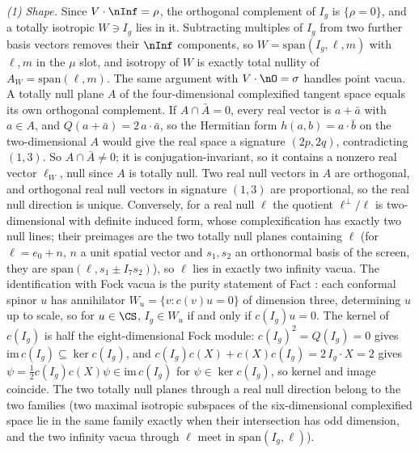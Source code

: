 \emph{(1) Shape.} Since $V\cdot\nInf = \rho$, the orthogonal complement of $I_g$ is $\{\rho = 0\}$, and a totally isotropic $W \ni I_g$ lies in it. Subtracting multiples of $I_g$ from two further basis vectors removes their $\nInf$ components, so $W = \mathrm{span}(I_g, \ell, m)$ with $\ell, m$ in the $\mu$ slot, and isotropy of $W$ is exactly total nullity of $A_W = \mathrm{span}(\ell, m)$. The same argument with $V\cdot\nO = \sigma$ handles point vacua. A totally null plane $A$ of the four-dimensional complexified tangent space equals its own orthogonal complement. If $A \cap \bar A = 0$, every real vector is $a + \bar a$ with $a \in A$, and $Q(a + \bar a) = 2\,a\cdot\bar a$, so the Hermitian form $h(a, b) = a\cdot\bar b$ on the two-dimensional $A$ would give the real space a signature $(2p, 2q)$, contradicting $(1,3)$. So $A \cap \bar A \neq 0$; it is conjugation-invariant, so it contains a nonzero real vector $\ell_W$, null since $A$ is totally null. Two real null vectors in $A$ are orthogonal, and orthogonal real null vectors in signature $(1,3)$ are proportional, so the real null direction is unique. Conversely, for a real null $\ell$ the quotient $\ell^{\perp}/\ell$ is two-dimensional with definite induced form, whose complexification has exactly two null lines; their preimages are the two totally null planes containing $\ell$ (for $\ell = e_{0} + n$, $n$ a unit spatial vector and $s_{1}, s_{2}$ an orthonormal basis of the screen, they are $\mathrm{span}(\ell, s_{1} \pm I_{7}s_{2})$), so $\ell$ lies in exactly two infinity vacua. The identification with Fock vacua is the purity statement of Fact : each conformal spinor $u$ has annihilator $W_u = \{v : c(v)u = 0\}$ of dimension three, determining $u$ up to scale, so for $u \in \CS$, $I_g \in W_u$ if and only if $c(I_g)u = 0$. The kernel of $c(I_g)$ is half the eight-dimensional Fock module: $c(I_g)^{2} = Q(I_g) = 0$ gives $\mathrm{im}\,c(I_g) \subseteq \ker c(I_g)$, and $c(I_g)c(X) + c(X)c(I_g) = 2\,I_g\cdot X = 2$ gives $\psi = \tfrac12 c(I_g)c(X)\psi \in \mathrm{im}\,c(I_g)$ for $\psi \in \ker c(I_g)$, so kernel and image coincide. The two totally null planes through a real null direction belong to the two families (two maximal isotropic subspaces of the six-dimensional complexified space lie in the same family exactly when their intersection has odd dimension, and the two infinity vacua through $\ell$ meet in $\mathrm{span}(I_g, \ell)$).

